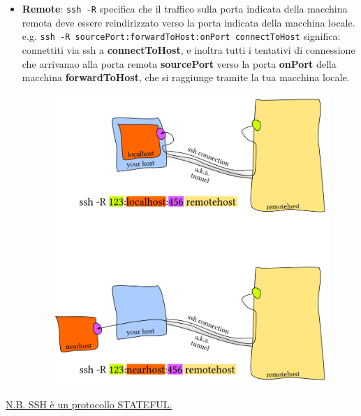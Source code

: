 \documentclass[11pt,a4paper,oneside]{book}
\theoremstyle{definition}
\begin{document}
\begin{itemize}
	      \pagebreak

	\item \textbf{Remote}: \texttt{ssh -R} specifica che il traffico sulla porta indicata della macchina remota deve essere reindirizzato verso la porta indicata della macchina locale.\newline
	      e.g. \texttt{ssh -R sourcePort:forwardToHost:onPort connectToHost} significa: connettiti via ssh a \textbf{connectToHost}, e inoltra tutti i tentativi di connessione che arrivanao alla porta remota \textbf{sourcePort} verso la porta \textbf{onPort} della macchina \textbf{forwardToHost}, che si raggiunge tramite la tua macchina locale.
	      \begin{figure}[!h]
		      \includegraphics[scale=0.9]{Immagini/Remote_ssh.png}
		      \centering
	      \end{figure}
\end{itemize}
\underline{N.B. SSH è un protocollo STATEFUL.}

\pagebreak
\end{document}
